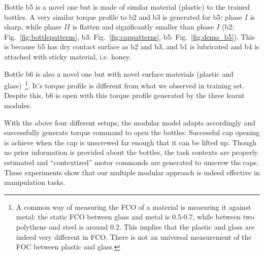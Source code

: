 Bottle b5 is a novel one but is made of similar material (plastic) to the trained bottles. A very similar torque profile to b2 and b3 is generated for b5: phase $I$ is sharp, while phase $II$ is flatten and significantly smaller than phase $I$ (b2: Fig.~\ref{fig:bottlepatterns}, b3: Fig.~\ref{fig:cappatterns}, b5: Fig.~\ref{fig:demo_b5}). This is because b5 has dry contact surface as b2 and b3, and b1 is lubricated and b4 is attached with sticky material, i.e. honey.

Bottle b6 is also a novel one but with novel surface materials (plastic and glass)~\footnote{A common way of measuring the FCO of a material is measuring it against metal: the static FCO between glass and metal is 0.5-0.7, while between two polythene and steel is around 0.2. This implies that the plastic and glass are indeed very different in FCO. There is not an universal measurement of the FOC between plastic and glass.}. It's torque profile is different from what we observed in training set. Despite this, b6 is open with this torque profile generated by the three learnt modules.


With the above four different setups, the modular model adapts accordingly and successfully generate torque command to open the bottles. Successful cap opening is achieve when the cap is unscrewed far enough that it can be lifted up. Though no prior information is provided about the bottles, the task contexts are properly estimated and ``contextized'' motor commands are generated to unscrew the caps. These experiments show that our multiple modular approach is indeed effective in manipulation tasks.



